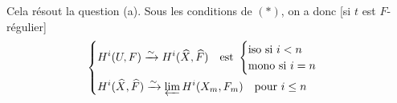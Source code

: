Cela résout la question (a). Sous les conditions de $(*)$, on a donc [si $t$ est $F$-régulier]
\[
\left\{\begin{aligned}
&H^i(U,F)\xrightarrow{\sim} H^i(\widehat X,\widehat F)\quad\text{est }
\begin{cases}\text{iso si }i<n\\ \text{mono si }i=n\end{cases}\\
&H^i(\widehat X,\widehat F)\xrightarrow{\sim}\varprojlim H^i(X_m,F_m)\quad\text{pour }i\leq n
\end{aligned}\right.
\]
